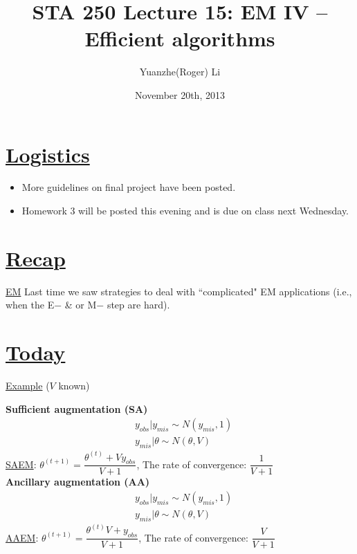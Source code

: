 \documentclass[12pt]{article}
\title{STA 250 Lecture 15: EM IV -- Efficient algorithms }
\author{Yuanzhe(Roger) Li}
\date{November 20th, 2013}
\begin{document}
\maketitle

\bigskip\noindent
\begin{flushleft}
\section*{\underline{Logistics}}
\begin{itemize}
    \item More guidelines on final project have been posted.
    \item Homework 3 will be posted this evening and is due on class next Wednesday.
\end{itemize}

\section*{\underline{Recap}}
\underline{EM} Last time we saw strategies to deal with ``complicated" EM applications (i.e., when the E$-$ \& or M$-$ step are hard).

\section*{\underline{Today}}
\underline{Example} ($V$ known)

{\bf Sufficient augmentation (SA)}\\
\begin{align*}
&y_{obs}| y_{mis} \sim N(y_{mis},1)\\
&y_{mis}| \theta \sim N(\theta,V)
\end{align*}
\underline{SAEM}: $\theta^{(t+1)}=\dfrac{\theta^{(t)}+Vy_{obs}}{V+1}$, The rate of convergence: $\dfrac{1}{V+1}$\\

\bigskip
{\bf Ancillary augmentation (AA)}
\begin{align*}
&y_{obs}| y_{mis} \sim N(y_{mis},1)\\
&y_{mis}| \theta \sim N(\theta,V)
\end{align*}
\underline{AAEM}: $\theta^{(t+1)}=\dfrac{\theta^{(t)}V+y_{obs}}{V+1}$, The rate of convergence: $\dfrac{V}{V+1}$\\


\end{flushleft}
\end{document}
